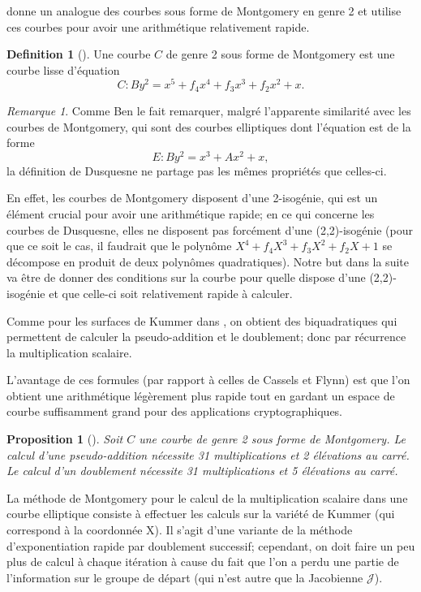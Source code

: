 \documentclass[a4paper,12pt]{article}
\newtheorem{proposition}[theoreme]{Proposition}
\theoremstyle{definition}
\newtheorem{definition}{Definition}[section]
\theoremstyle{remark}
\newtheorem{remarque}{Remarque}
\numberwithin{equation}{section}
\begin{document}
\citet{duquesne} donne un analogue des courbes sous forme de Montgomery en genre 2 et utilise ces courbes pour avoir une arithmétique relativement rapide.

\begin{definition}[\citep{duquesne}]
Une courbe $C$ de genre 2 sous forme de Montgomery est une courbe lisse d'équation
$$C : By^2 = x^5 + f_4x^4 + f_3x^3 + f_2x^2 + x.$$
\end{definition}

\begin{remarque}
Comme Ben le fait remarquer, malgré l'apparente similarité avec les courbes de Montgomery, qui sont des courbes elliptiques dont l'équation est de la forme
$$E : By^2 = x^3 + Ax^2 + x,$$
la définition de Dusquesne ne partage pas les mêmes propriétés que celles-ci.

En effet, les courbes de Montgomery disposent d'une 2-isogénie, qui est un élément crucial pour avoir une arithmétique rapide; en ce qui concerne les courbes de Dusquesne, elles ne disposent pas forcément d'une (2,2)-isogénie (pour que ce soit le cas, il faudrait que le polynôme $X^4+f_4X^3+f_3X^2+f_2X+1$ se décompose en produit de deux polynômes quadratiques). Notre but dans la suite va être de donner des conditions sur la courbe pour quelle dispose d'une (2,2)-isogénie et que celle-ci soit relativement rapide à calculer.
\end{remarque}

Comme pour les surfaces de Kummer dans \citep{cassels-Flynn}, on obtient des biquadratiques qui permettent de calculer la pseudo-addition et le doublement; donc par récurrence la multiplication scalaire.

L'avantage de ces formules (par rapport à celles de Cassels et Flynn) est que l'on obtient une arithmétique légèrement plus rapide tout en gardant un espace de courbe suffisamment grand pour des applications cryptographiques.

\begin{proposition}[\citet{duquesne}]
\label{propDuquesne}
Soit $C$ une courbe de genre 2 sous forme de Montgomery. Le calcul d'une pseudo-addition nécessite 31 multiplications et 2 élévations au carré. Le calcul d'un doublement nécessite 31 multiplications et 5 élévations au carré.
\end{proposition}

La méthode de Montgomery pour le calcul de la multiplication scalaire dans une courbe elliptique consiste à effectuer les calculs sur la variété de Kummer (qui correspond à la coordonnée X). Il s'agit d'une variante de la méthode d'exponentiation rapide par doublement successif; cependant, on doit faire un peu plus de calcul à chaque itération à cause du fait que l'on a perdu une partie de l'information sur le groupe de départ (qui n'est autre que la Jacobienne $\mathcal{J}$).
\end{document}
